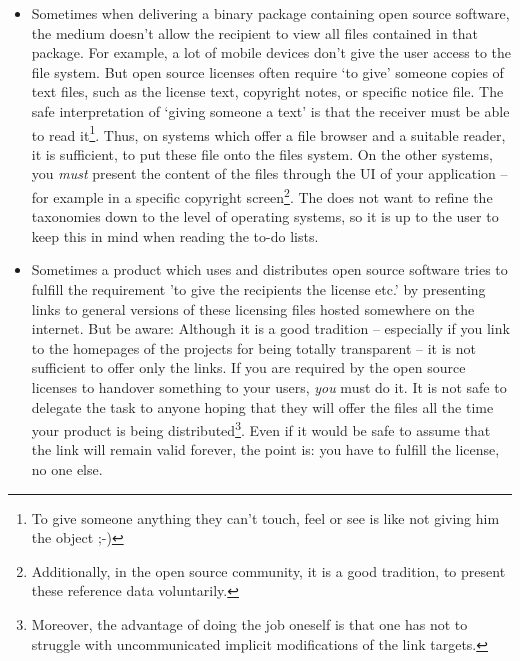 \label{DistributingFilesHint}
\begin{itemize}
  \item
  Sometimes when delivering a binary package containing open source software,
  the medium doesn’t allow the recipient to view all files contained in that
  package. For example, a lot of mobile devices don’t give the user access to
  the file system. But open source licenses often require ‘to give’ someone
  copies of text files, such as the license text, copyright notes, or specific
  notice file. The safe interpretation of ‘giving someone a text’ is that the
  receiver must be able to read it\footnote{To give someone anything they can't
  touch, feel or see is like not giving him the object ;-)}. Thus, on
  systems which offer a file browser and a suitable reader, it is sufficient, to
  put these file onto the files system. On the other systems, you \emph{must}
  present the content of the files  through the UI of your application -- for
  example in a specific copyright screen\footnote{Additionally, in the open
  source community, it is a good tradition, to present these reference data
  voluntarily.}. The \oslic{} does not want to refine the taxonomies down to the
  level of operating systems, so it is up to the user to keep this in mind when
  reading the to-do lists.
  
  \item Sometimes a product which uses and distributes open source software
  tries to fulfill the requirement 'to give the recipients the license etc.' by
  presenting links to general versions of these licensing files hosted somewhere
  on the internet. But be aware: Although it is a good tradition -- especially
  if you link to the homepages of the projects for being totally transparent --
  it is not sufficient to offer only the links. If you are required by the open
  source licenses to handover something to your users, \emph{you} must do it. It
  is not safe to delegate the task to anyone hoping that they will offer the
  files all the time your product is being distributed\footnote{Moreover, the
  advantage of doing the job oneself is that one has not to struggle with
  uncommunicated implicit modifications of the link targets.}. Even if it would
  be safe to assume that the link will remain valid forever, the point is: you
  have to fulfill the license, no one else.
\end{itemize}

\label{OSUCToDoLists}
